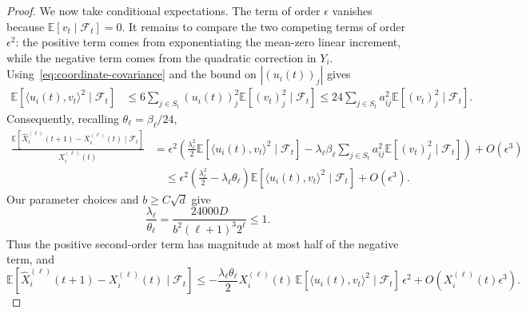 \documentclass[reqno]{amsart}
\theoremstyle{definition}
\newcommand{\E}{\mathbb E}
\newcommand{\ip}[2]{\langle#1,#2\rangle}
\begin{document}
\begin{proof}
We now take conditional expectations. The term of order $\epsilon$ vanishes because $\E[v_t\mid\mathcal F_t]=0$. It remains to compare the two competing terms of order $\epsilon^2$: the positive term comes from exponentiating the mean-zero linear increment, while the negative term comes from the quadratic correction in $Y_i$. Using~\eqref{eq:coordinate-covariance} and the bound on $|(u_i(t))_j|$ gives
\[ \begin{aligned} \E[\ip{u_i(t)}{v_t}^2\mid\mathcal F_t] &\le6\sum_{j\in S_t}(u_i(t))_j^2 \E[(v_t)_j^2\mid\mathcal F_t] \le24\sum_{j\in S_t}a_{ij}^2 \E[(v_t)_j^2\mid\mathcal F_t]. \end{aligned} \]
Consequently, recalling $\theta_\ell=\beta_\ell/24$,
\[
\begin{aligned}
  \frac{ \E[\widehat X_i^{(\ell)}(t+1) -X_i^{(\ell)}(t)\mid\mathcal F_t] }{X_i^{(\ell)}(t)} &=\epsilon^2\left( \frac{\lambda_\ell^2}{2} \E[\ip{u_i(t)}{v_t}^2\mid\mathcal F_t] -\lambda_\ell\beta_\ell \sum_{j\in S_t}a_{ij}^2 \E[(v_t)_j^2\mid\mathcal F_t] \right)+O(\epsilon^3)\\
  &\quad\le\epsilon^2 \left(\frac{\lambda_\ell^2}{2} -\lambda_\ell\theta_\ell\right) \E[\ip{u_i(t)}{v_t}^2\mid\mathcal F_t] +O(\epsilon^3).
\end{aligned}
\]
Our parameter choices and $b\ge C\sqrt d$ give
\begin{equation}\label{eq:lambda-theta} \frac{\lambda_\ell}{\theta_\ell} =\frac{24000D}{b^2(\ell+1)^3 2^\ell}\le1. \end{equation}
Thus the positive second-order term has magnitude at most half of the negative term, and
\begin{equation}\label{eq:row-drift} \E[\widehat X_i^{(\ell)}(t+1) -X_i^{(\ell)}(t)\mid\mathcal F_t] \le -\frac{\lambda_\ell\theta_\ell}{2} X_i^{(\ell)}(t) \, \E[\ip{u_i(t)}{v_t}^2\mid\mathcal F_t]\,\epsilon^2 +O\!\left(X_i^{(\ell)}(t)\epsilon^3\right). \end{equation}



\end{proof}
\end{document}
